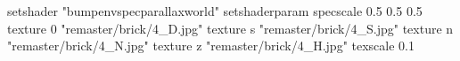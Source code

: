 setshader "bumpenvspecparallaxworld"
setshaderparam specscale 0.5 0.5 0.5
    texture 0 "remaster/brick/4_D.jpg"
    texture s "remaster/brick/4_S.jpg"
    texture n "remaster/brick/4_N.jpg"
    texture z "remaster/brick/4_H.jpg"
    texscale 0.1